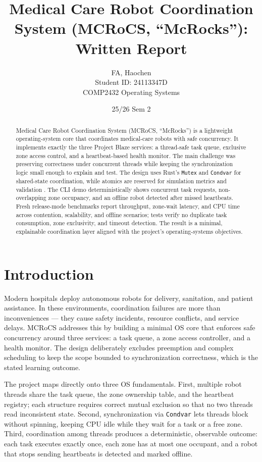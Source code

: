 \documentclass[11pt]{article}
\title{Medical Care Robot Coordination System (MCRoCS, ``McRocks''): Written Report}
\author{FA, Haochen\\Student ID: 24113347D\\COMP2432 Operating Systems}
\date{25/26 Sem 2}
\begin{document}
\maketitle

\begin{abstract}
Medical Care Robot Coordination System (MCRoCS, ``McRocks'') is a lightweight operating-system core that coordinates medical-care robots with safe concurrency. It implements exactly the three Project Blaze services: a thread-safe task queue, exclusive zone access control, and a heartbeat-based health monitor. The main challenge was preserving correctness under concurrent threads while keeping the synchronization logic small enough to explain and test. The design uses Rust's \texttt{Mutex} and \texttt{Condvar} for shared-state coordination, while atomics are reserved for simulation metrics and validation \citep{rustmutex,rustcondvar}. The CLI demo deterministically shows concurrent task requests, non-overlapping zone occupancy, and an offline robot detected after missed heartbeats. Fresh release-mode benchmarks report throughput, zone-wait latency, and CPU time across contention, scalability, and offline scenarios; tests verify no duplicate task consumption, zone exclusivity, and timeout detection. The result is a minimal, explainable coordination layer aligned with the project's operating-systems objectives.
\end{abstract}

\section{Introduction}
Modern hospitals deploy autonomous robots for delivery, sanitation, and patient assistance. In these environments, coordination failures are more than inconveniences --- they cause safety incidents, resource conflicts, and service delays. MCRoCS addresses this by building a minimal OS core that enforces safe concurrency around three services: a task queue, a zone access controller, and a health monitor. The design deliberately excludes preemption and complex scheduling to keep the scope bounded to synchronization correctness, which is the stated learning outcome.

The project maps directly onto three OS fundamentals. First, multiple robot threads share the task queue, the zone ownership table, and the heartbeat registry; each structure requires correct mutual exclusion so that no two threads read inconsistent state. Second, synchronization via \texttt{Condvar} lets threads block without spinning, keeping CPU idle while they wait for a task or a free zone. Third, coordination among threads produces a deterministic, observable outcome: each task executes exactly once, each zone has at most one occupant, and a robot that stops sending heartbeats is detected and marked offline.
\end{document}
